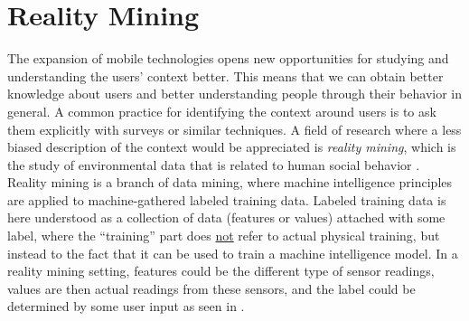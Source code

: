
\section{Reality Mining}
\label{sec:reality_mining}
The expansion of mobile technologies opens new opportunities for studying and understanding the users' context better. This means that we can obtain better knowledge about users and better understanding people through their behavior in general. A common practice for identifying the context around users is to ask them explicitly with surveys or similar techniques. A field of research where a less biased description of the context would be appreciated is \emph{reality mining}, which is the study of environmental data that is related to human social behavior \parencite{madan2009_reality_mining_privacy}. Reality mining is a branch of data mining, where machine intelligence principles are applied to machine-gathered labeled training data. Labeled training data is here understood as a collection of data (features or values) attached with some label, where the ``training'' part does \underline{not} refer to actual physical training, but instead to the fact that it can be used to train a machine intelligence model. In a reality mining setting, features could be the different type of sensor readings, values are then actual readings from these sensors, and the label could be determined by some user input as seen in .
\begin{table}[!htbp]
    \centering
    \caption{Example of labeled training data.}
    \label{tab:labeled_training_data}
\end{table}

